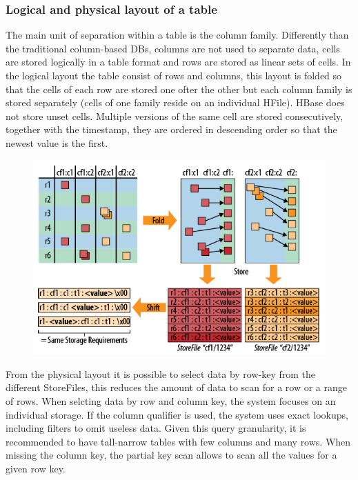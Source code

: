 		\subsubsection{Logical and physical layout of a table}
			 The main unit of separation within a table is the column family. Differently than the traditional column-based DBs, columns are not used to separate data, cells are stored logically in a table format and rows are stored as linear sets of cells.\newline
			 In the logical layout the table consist of rows and columns, this layout is folded so that the cells of each row are stored one ofter the other but each column family is stored separately (cells of one family reside on an individual HFile). HBase does not store unset cells.
			 Multiple versions of the same cell are stored consecutively, together with the timestamp, they are ordered in descending order so that the newest value is the first.
			 \begin{figure}[H]
			 	\centering
			 	\includegraphics[width=0.65\linewidth]{images/hbaselayout.png}
			 \end{figure}
			 From the physical layout it is possible to select data by row-key from the different StoreFiles, this reduces the amount of data to scan for a row or a range of rows. When selcting data by row and column key, the system focuses on an individual storage. If the column qualifier is used, the system uses exact lookups, including filters to omit useless data.\newline
			 \newline
			 Given this query granularity, it is recommended to have tall-narrow tables with few columns and many rows.\newline
			 When missing the column key, the partial key scan allows to scan all the values for a given row key.
